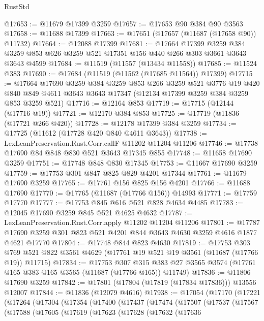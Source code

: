 \begin{lexlean}{RustStd}
\begin{coremodule}
@17653 := @11679 @17399 @3259
@17657 := @17653 @90 @384 @90 @3563
@17658 := @11688 @17399
@17663 := @17651 (@17657 (@11687 (@17658 @90)) @11732)
@17664 := @12088 @17399
@17681 := @17664
    @17399
    @3259
    @384
    @3259
    @853
    @626
    @3259
    @521
    @17351
    @156
    @440
    @266
    @303
    @3661
    @3643
    @3643
    @4599
@17684 := @11519 (@11557 (@13434 @11558))
@17685 := @11524 @383
@17690 := @17684 (@11519 (@11562 (@17685 @11564)) @17399)
@17715 := @17664
    @17690
    @3259
    @384
    @3259
    @853
    @266
    @3259
    @521
    @3776
    @19
    @420
    @840
    @849
    @4611
    @3643
    @3643
    @17347
    (@12134 @17399 @3259 @384 @3259 @853 @3259 @521)
@17716 := @12164 @853
@17719 := @17715 (@12144 (@17716 @19))
@17721 := @12170 @384 @853
@17725 := @17719 (@11836 (@17721 @266 @420))
@17728 := @12178 @17399 @384 @3259
@17734 := @17725 (@11612 (@17728 @420 @840 @4611 @3643))
@17738 := LexLeanPreservation.Rust.Corr.callF @11202 @11204 @11206
@17746 := @17738 @17690 @84 @848 @830 @521 @3643 @17345 @855
@17748 := @11658 @17690 @3259
@17751 := @17748 @848 @830 @17345
@17753 := @11667 @17690 @3259
@17759 := @17753 @301 @847 @825 @829 @4201 @17344
@17761 := @11679 @17690 @3259
@17765 := @17761 @156 @825 @156 @4201
@17766 := @11688 @17690
@17770 := @17765 (@11687 (@17766 @156)) @14993
@17771 := @17759 @17770
@17777 := @17753 @845 @616 @521 @828 @4634 @4485
@17783 := @12045 @17690 @3259 @845 @521 @4625 @4632
@17787 := LexLeanPreservation.Rust.Corr.apply @11202 @11204 @11206
@17801 := @17787 @17690 @3259 @301 @823 @521 @4201 @844 @3643 @4630 @3259 @4616 @1877 @4621 @17770
@17804 := @17748 @844 @823 @4630
@17819 := @17753
    @303
    @769
    @521
    @822
    @3561
    @4629
    (@17761 @19 @521 @19 @3561 (@11687 (@17766 @19)) @11715)
@17834 := @17753
    @307
    @315
    @383
    @27
    @3565
    @3574
    (@17761 @165 @383 @165 @3565 (@11687 (@17766 @165)) @11749)
@17836 := @11806 @17690 @3259
@17842 := @17801 (@17804 (@17819 (@17834 @17836))) @13556 @12007
@17844 := @11836 (@12079 @4616)
@17938 := @17054
    (@17170
      (@17221
        (@17264
          (@17304
            (@17354
              (@17400
                (@17437
                  (@17474
                    (@17507
                      (@17537
                        (@17567
                          (@17588
                            (@17605
                              (@17619
                                (@17623
                                  (@17628
                                    (@17632
                                      (@17636

\end{coremodule}
\end{lexlean}
